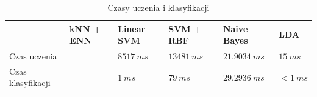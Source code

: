 \documentclass[[10pt,a4paper]{article}
\begin{document}
\begin{table}[h]
\centering
\caption{Czasy uczenia i klasyfikacji}
\label{timesTable}
\begin{tabular}{l|l|l|l|l|l|}
\cline{2-6}
                                        & kNN + ENN & Linear SVM & SVM + RBF & Naive Bayes & LDA \\ \hline
\multicolumn{1}{|l|}{Czas uczenia}      &           &  $8517\: ms$   &   $13481\: ms$   &   $21.9034\: ms$ & $15\: ms$    \\ \hline
\multicolumn{1}{|l|}{Czas klasyfikacji} &           &   $1\: ms$  &      $79\: ms$     &     $29.2936\: ms$        & $< 1\: ms$  \\ \hline
\end{tabular}
\end{table}
\end{document}
